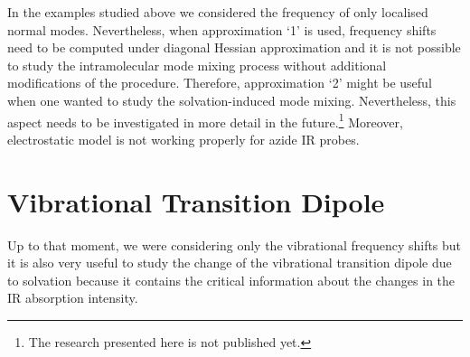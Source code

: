 \documentclass[b5paper,oneside,fleqn,11pt]{book}
\begin{document}
\begin{refsection}
In the examples studied above we considered the frequency of only localised 
normal modes. Nevertheless, when approximation `1'
is used, frequency shifts need to be computed under diagonal Hessian approximation
and it is not possible to study the intramolecular mode mixing process without additional 
modifications of the procedure. Therefore, approximation `2' might be useful when one
wanted to study the solvation\hyp{}induced mode mixing. Nevertheless, this aspect needs to
be investigated in more detail in the future.\footnote{The research presented here is not published yet.}
Moreover, electrostatic model is not working properly for azide IR probes.

\section{Vibrational Transition Dipole\label{s:vibr-trans-dipole}}

Up to that moment, we were considering only the vibrational frequency shifts
but it is also very useful to study the change of the vibrational
transition dipole due to solvation because it contains the critical
information about the changes in the IR absorption intensity.


\end{refsection}
\end{document}
